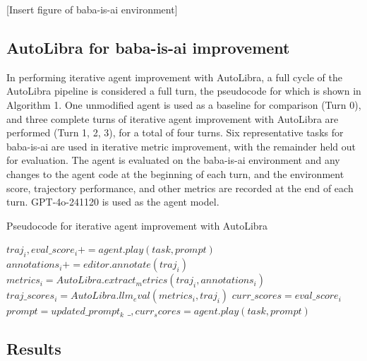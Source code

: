 [Insert figure of baba-is-ai environment]

\subsection{AutoLibra for baba-is-ai improvement}

In performing iterative agent improvement with AutoLibra, a full cycle of the AutoLibra pipeline is considered a full turn, the pseudocode for which is shown in Algorithm 1. One unmodified agent is used as a baseline for comparison (Turn 0), and three complete turns of iterative agent improvement with AutoLibra are performed (Turn 1, 2, 3), for a total of four turns. Six representative tasks for baba-is-ai are used in iterative metric improvement, with the remainder held out for evaluation. The agent is evaluated on the baba-is-ai environment and any changes to the agent code at the beginning of each turn, and the environment score, trajectory performance, and other metrics are recorded at the end of each turn. GPT-4o-241120 is used as the agent model.


\begin{algorithm}
    \caption{Pseudocode for iterative agent improvement with AutoLibra}
    \begin{algorithmic}[1]
            \State $traj_i, eval\_score_i += agent.play(task, prompt)$
            \State $annotations_i += editor.annotate(traj_i)$
        \EndFor
        \State $metrics_i = AutoLibra.extract_metrics(traj_i, annotations_i)$
        \State $traj\_scores_i = AutoLibra.llm_eval(metrics_i, traj_i)$
        \State $curr\_scores = eval\_score_i$
            \State $prompt = updated\_prompt_k$
                \State $\_, curr_scores = agent.play(task, prompt)$
            \EndFor
        \EndWhile
    \EndFor

    \end{algorithmic}
\end{algorithm}

\label{tab:metrics}
\label{tab:metric_perf}
\label{tab:heldout}

\subsection{Results}

